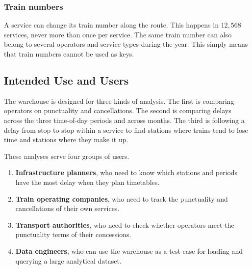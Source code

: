 \subsubsection{Train numbers}
A service can change its train number along the route. This happens in $12{,}568$ services, never more than once per service. The same train number can also belong to several operators and service types during the year. This simply means that train numbers cannot be used as keys.

\subsection{Intended Use and Users}
\label{subsec:usage_users}

The warehouse is designed for three kinds of analysis. The first is comparing operators on punctuality and cancellations. The second is comparing delays across the three time-of-day periods and across months. The third is following a delay from stop to stop within a service to find stations where trains tend to lose time and stations where they make it up.

These analyses serve four groups of users.
\begin{enumerate}
    \item \textbf{Infrastructure planners}, who need to know which stations and periods have the most delay when they plan timetables.
    \item \textbf{Train operating companies}, who need to track the punctuality and cancellations of their own services.
    \item \textbf{Transport authorities}, who need to check whether operators meet the punctuality terms of their concessions.
    \item \textbf{Data engineers}, who can use the warehouse as a test case for loading and querying a large analytical dataset.
\end{enumerate}
